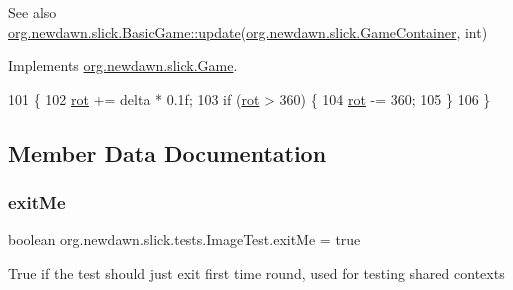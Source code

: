 \begin{DoxySeeAlso}{See also}
\mbox{\hyperlink{classorg_1_1newdawn_1_1slick_1_1_basic_game_acfe6fa05aef83bff1631af91a3e4bd20}{org.\+newdawn.\+slick.\+Basic\+Game\+::update}}(\mbox{\hyperlink{classorg_1_1newdawn_1_1slick_1_1_game_container}{org.\+newdawn.\+slick.\+Game\+Container}}, int) 
\end{DoxySeeAlso}


Implements \mbox{\hyperlink{interfaceorg_1_1newdawn_1_1slick_1_1_game_ab07b2e9463ee4631620dde0de25bdee8}{org.\+newdawn.\+slick.\+Game}}.


\begin{DoxyCode}
101                                                            \{
102         \mbox{\hyperlink{classorg_1_1newdawn_1_1slick_1_1tests_1_1_image_test_a6fbbcc82d7dea5cda7b3a5bbe47c1cf0}{rot}} += delta * 0.1f;
103         \textcolor{keywordflow}{if} (\mbox{\hyperlink{classorg_1_1newdawn_1_1slick_1_1tests_1_1_image_test_a6fbbcc82d7dea5cda7b3a5bbe47c1cf0}{rot}} > 360) \{
104             \mbox{\hyperlink{classorg_1_1newdawn_1_1slick_1_1tests_1_1_image_test_a6fbbcc82d7dea5cda7b3a5bbe47c1cf0}{rot}} -= 360;
105         \}
106     \}
\end{DoxyCode}


\subsection{Member Data Documentation}
\mbox{\label{classorg_1_1newdawn_1_1slick_1_1tests_1_1_image_test_ab4f8dc82794bf9949ac7efc7c1121bcc}} 
\subsubsection{\texorpdfstring{exit\+Me}{exitMe}}
{\footnotesize\ttfamily boolean org.\+newdawn.\+slick.\+tests.\+Image\+Test.\+exit\+Me = true\hspace{0.3cm}{\ttfamily [static]}}

True if the test should just exit first time round, used for testing shared contexts \mbox{\label{classorg_1_1newdawn_1_1slick_1_1tests_1_1_image_test_a382ccf0243ecc6050b7a56037fd71f54}} 
